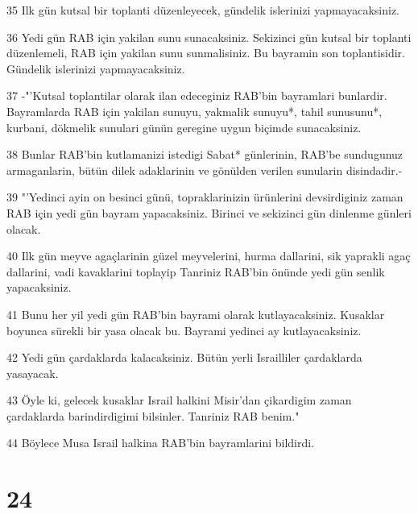 \par 35 Ilk gün kutsal bir toplanti düzenleyecek, gündelik islerinizi yapmayacaksiniz.
\par 36 Yedi gün RAB için yakilan sunu sunacaksiniz. Sekizinci gün kutsal bir toplanti düzenlemeli, RAB için yakilan sunu sunmalisiniz. Bu bayramin son toplantisidir. Gündelik islerinizi yapmayacaksiniz.
\par 37 -"'Kutsal toplantilar olarak ilan edeceginiz RAB'bin bayramlari bunlardir. Bayramlarda RAB için yakilan sunuyu, yakmalik sunuyu*, tahil sunusunu*, kurbani, dökmelik sunulari günün geregine uygun biçimde sunacaksiniz.
\par 38 Bunlar RAB'bin kutlamanizi istedigi Sabat* günlerinin, RAB'be sundugunuz armaganlarin, bütün dilek adaklarinin ve gönülden verilen sunularin disindadir.-
\par 39 "'Yedinci ayin on besinci günü, topraklarinizin ürünlerini devsirdiginiz zaman RAB için yedi gün bayram yapacaksiniz. Birinci ve sekizinci gün dinlenme günleri olacak.
\par 40 Ilk gün meyve agaçlarinin güzel meyvelerini, hurma dallarini, sik yaprakli agaç dallarini, vadi kavaklarini toplayip Tanriniz RAB'bin önünde yedi gün senlik yapacaksiniz.
\par 41 Bunu her yil yedi gün RAB'bin bayrami olarak kutlayacaksiniz. Kusaklar boyunca sürekli bir yasa olacak bu. Bayrami yedinci ay kutlayacaksiniz.
\par 42 Yedi gün çardaklarda kalacaksiniz. Bütün yerli Israilliler çardaklarda yasayacak.
\par 43 Öyle ki, gelecek kusaklar Israil halkini Misir'dan çikardigim zaman çardaklarda barindirdigimi bilsinler. Tanriniz RAB benim."
\par 44 Böylece Musa Israil halkina RAB'bin bayramlarini bildirdi.

\chapter{24}

